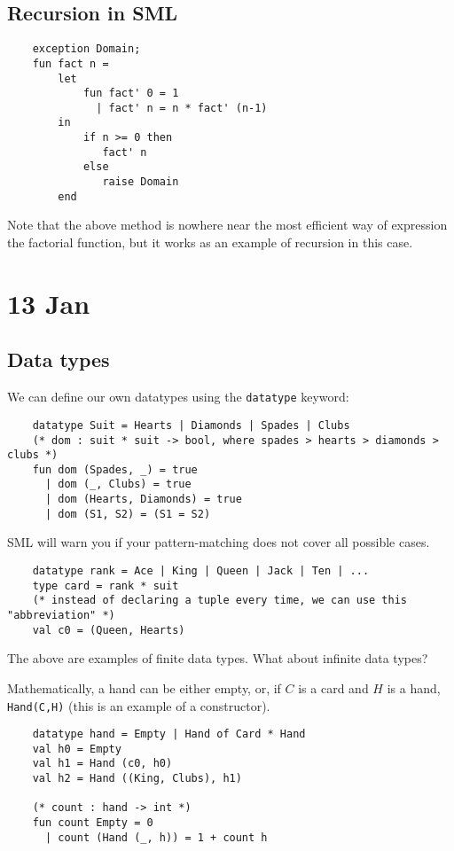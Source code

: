 \documentclass[11pt]{article}
\begin{document}
\subsection{Recursion in SML}
\begin{verbatim}
    exception Domain;
    fun fact n =
        let
            fun fact' 0 = 1
              | fact' n = n * fact' (n-1)
        in
            if n >= 0 then
               fact' n
            else
               raise Domain
        end
\end{verbatim}

Note that the above method is nowhere near the most efficient way of expression the factorial function, but it works as an example of recursion in this case.

\section{13 Jan} %
\subsection{Data types}
We can define our own datatypes using the \verb!datatype! keyword:
\begin{verbatim}
    datatype Suit = Hearts | Diamonds | Spades | Clubs
    (* dom : suit * suit -> bool, where spades > hearts > diamonds > clubs *)
    fun dom (Spades, _) = true
      | dom (_, Clubs) = true
      | dom (Hearts, Diamonds) = true
      | dom (S1, S2) = (S1 = S2)
\end{verbatim}
SML will warn you if your pattern-matching does not cover all possible cases.

\begin{verbatim}
    datatype rank = Ace | King | Queen | Jack | Ten | ...
    type card = rank * suit     
    (* instead of declaring a tuple every time, we can use this "abbreviation" *)
    val c0 = (Queen, Hearts)
\end{verbatim}

The above are examples of finite data types. What about infinite data types?

Mathematically, a hand can be either empty, or, if $C$ is a card and $H$ is a hand, \verb!Hand(C,H)! (this is an example of a constructor).

\begin{verbatim}
    datatype hand = Empty | Hand of Card * Hand
    val h0 = Empty
    val h1 = Hand (c0, h0)
    val h2 = Hand ((King, Clubs), h1)
    
    (* count : hand -> int *)
    fun count Empty = 0
      | count (Hand (_, h)) = 1 + count h
\end{verbatim}
\end{document}
